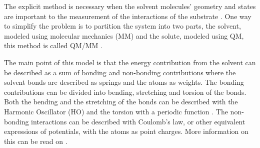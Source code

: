 \documentclass[../master_thesis.tex]{subfiles}
\begin{document}
The explicit method is necessary when the solvent molecules' geometry and states
are important to the measurement of the interactions of the substrate
\cite{Cramer:2004}.
One way to simplify the problem is to partition the system into two parts, the
solvent, modeled using molecular mechanics (MM) and the solute, modeled using
\ac{QM}, this method is called QM/MM \cite{Mennucci:2018}.

The main point of this model is that the energy contribution from the solvent
can be described as a sum of bonding and non-bonding contributions
\cite{Cramer:2004} where the solvent bonds are described as springs
\cite{Mennucci:2018} and the atoms as weights. The bonding contributions can be
divided into bending, stretching and torsion of the bonds. Both the bending
and the stretching of the bonds can be described with the Harmonic Oscillator
(HO) and the torsion with a periodic function \cite{Mennucci:2018}. The
non-bonding interactions can be described with Coulomb's law, or other equivalent
expressions of potentials, with the atoms as point charges. More information on
this can be read on \cite{Cramer:2004, Jensen:2017}.
\end{document}
